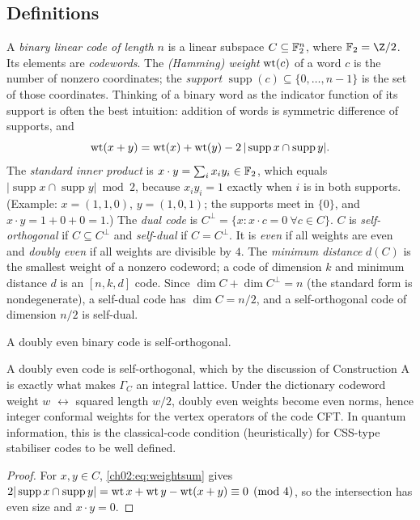 \subsection{Definitions}

A \emph{binary linear code of length $n$} is a linear subspace $C\subseteq\mathbb{F}_2^n$, where
$\chtwoF=\Z/2$.  Its elements are \emph{codewords}.  The \emph{(Hamming) weight}
$\operatorname{wt}(c)$ of a word $c$ is the number of nonzero coordinates; the \emph{support}
$\operatorname{supp}(c)\subseteq\{0,\dots,n-1\}$ is the set of those coordinates.  Thinking of a
binary word as the indicator function of its support is often the best intuition: addition of
words is symmetric difference of supports, and
\begin{equation}\label{ch02:eq:weightsum}
\operatorname{wt}(x+y)=\operatorname{wt}(x)+\operatorname{wt}(y)-2\,|\operatorname{supp}x\cap\operatorname{supp}y| .
\end{equation}
The \emph{standard inner product} is $x\cdot y=\sum_i x_iy_i\in\mathbb{F}_2$, which equals
$|\operatorname{supp}x\cap\operatorname{supp}y|\bmod2$, because $x_iy_i=1$ exactly when $i$ is in
both supports.  (Example: $x=(1,1,0)$, $y=(1,0,1)$; the supports meet in $\{0\}$, and $x\cdot
y=1+0+0=1$.)  The \emph{dual code} is
$C^\perp=\{x:x\cdot c=0\ \forall c\in C\}$.  $C$ is \emph{self-orthogonal} if $C\subseteq
C^\perp$ and \emph{self-dual} if $C=C^\perp$.  It is \emph{even} if all weights are even and
\emph{doubly even} if all weights are divisible by $4$.  The \emph{minimum distance} $d(C)$ is the
smallest weight of a nonzero codeword; a code of dimension $k$ and minimum distance $d$ is an
$[n,k,d]$ code.  Since $\dim C+\dim C^\perp=n$ (the standard form is nondegenerate), a
self-dual code has $\dim C=n/2$, and a self-orthogonal code of dimension $n/2$ is self-dual.

\begin{lemma}\label{ch02:lem:doublyeven}
A doubly even binary code is self-orthogonal.
\end{lemma}
\begin{physics}
A doubly even code is self-orthogonal, which by the discussion of Construction A is exactly what makes $\Gamma_C$ an integral lattice. Under the dictionary codeword weight $w$ $\leftrightarrow$ squared length $w/2$, doubly even weights become even norms, hence integer conformal weights for the vertex operators of the code CFT. In quantum information, this is the classical-code condition (heuristically) for CSS-type stabiliser codes to be well defined.
\end{physics}
\begin{proof}
For $x,y\in C$, \eqref{ch02:eq:weightsum} gives
$2|\operatorname{supp}x\cap\operatorname{supp}y|=\operatorname{wt} x+\operatorname{wt} y-\operatorname{wt}(x+y)\equiv0
\pmod4$, so the intersection has even size and $x\cdot y=0$.
\end{proof}

